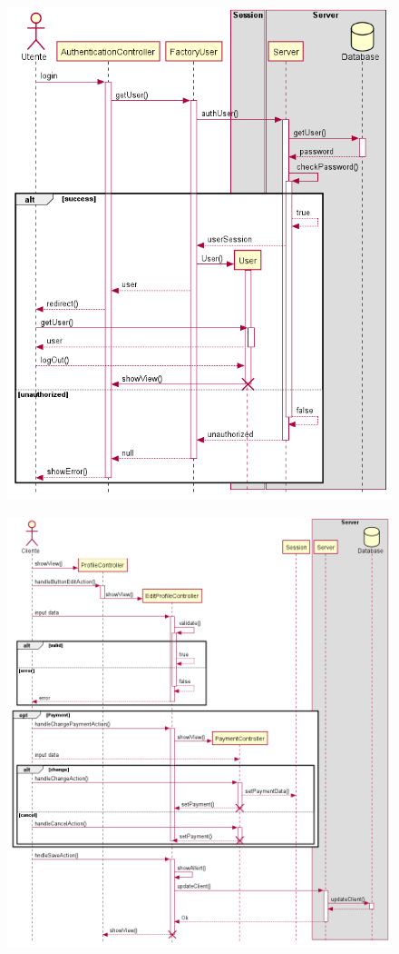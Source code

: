 \documentclass[12pt, a4paper]{article}
\begin{document}
\begin{figure}[H]
\centering
\includegraphics[width=\linewidth]{auth_sequence.png}

\end{figure}

\begin{figure}[H]
\centering
\includegraphics[width=\linewidth]{profile_sequence.png}

\end{figure}
\end{document}
